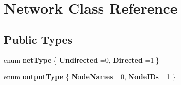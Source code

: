 \hypertarget{classNetwork}{}\section{Network Class Reference}
\label{classNetwork}
\subsection*{Public Types}
\begin{DoxyCompactItemize}
\item 
\hypertarget{classNetwork_a7e628548107e46864ae0c856bf5aaa9f}{}enum {\bfseries net\+Type} \{ {\bfseries Undirected} =0, 
{\bfseries Directed} =1
 \}\label{classNetwork_a7e628548107e46864ae0c856bf5aaa9f}

\item 
\hypertarget{classNetwork_a1743227a9ab62bdffe7eaf5e6826ca74}{}enum {\bfseries output\+Type} \{ {\bfseries Node\+Names} =0, 
{\bfseries Node\+I\+Ds} =1
 \}\label{classNetwork_a1743227a9ab62bdffe7eaf5e6826ca74}

\end{DoxyCompactItemize}
